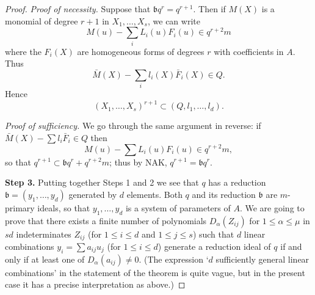 \begin{proof}
\emph{Proof of necessity.} Suppose that $\mathfrak{b}q^r = q^{r+1}$. Then if $M(X)$ is a
monomial of degree $r + 1$ in $X_1, \ldots, X_s$, we can write
\[
  M(u) - \sum_i L_i(u)F_i(u) \in q^{r+2}m
\]
where the $F_i(X)$ are homogeneous forms of degrees $r$ with coefficients in
$A$. Thus
\[
  \bar{M}(X) - \sum_i l_i(X)\bar{F}_i(X) \in Q.
\]
Hence
\[
  (X_1, \ldots, X_s)^{r+1} \subset (Q, l_1, \ldots, l_d).
\]

\emph{Proof of sufficiency.} We go through the same argument in reverse: if
$\bar{M}(X) - \sum l_i\bar{F}_i \in Q$ then
\[
  M(u) - \sum L_i(u)F_i(u) \in q^{r+2}m,
\]
so that $q^{r+1} \subset \mathfrak{b}q^r + q^{r+2}m$; thus by NAK, $q^{r+1} = \mathfrak{b}q^r$.

\textbf{Step 3.} Putting together Steps 1 and 2 we see that $q$ has a reduction
$\mathfrak{b} = (y_1, \ldots, y_d)$ generated by $d$ elements. Both $q$ and its reduction $\mathfrak{b}$ are
$m$-primary ideals, so that $y_1, \ldots, y_d$ is a system of parameters of $A$. We
are going to prove that there exists a finite number of polynomials $D_\alpha(Z_{ij})$
for $1 \le \alpha \le \mu$ in $sd$ indeterminates $Z_{ij}$ (for $1 \le i \le d$ and $1 \le j \le s$) such that
$d$ linear combinations $y_i = \sum a_{ij}u_j$ (for $1 \le i \le d$) generate a reduction ideal
of $q$ if and only if at least one of $D_\alpha(a_{ij}) \neq 0$. (The expression `$d$ sufficiently
general linear combinations' in the statement of the theorem is quite vague,
but in the present case it has a precise interpretation as above.)


\end{proof}
